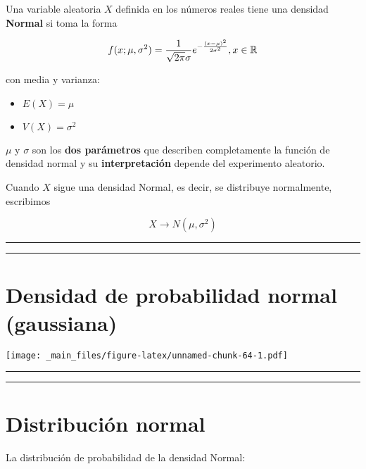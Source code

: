\documentclass[
]{book}
\providecommand{\tightlist}{%
  \setlength{\itemsep}{0pt}\setlength{\parskip}{0pt}}
\begin{document}
Una variable aleatoria \(X\) definida en los números reales tiene una densidad \textbf{Normal} si toma la forma

\[f(x; \mu, \sigma^2)=\frac{1}{\sqrt{2\pi}\sigma}e^{-\frac{(x-\mu)^2}{2\sigma^2}}, x \in  {\Bbb R}\]

con media y varianza:

\begin{itemize}
\tightlist
\item
  \(E(X) = \mu\)
\item
  \(V (X) = \sigma^2\)
\end{itemize}

\(\mu\) y \(\sigma\) son los \textbf{dos parámetros} que describen completamente la función de densidad normal y su \textbf{interpretación} depende del experimento aleatorio.

Cuando \(X\) sigue una densidad Normal, es decir, se distribuye normalmente, escribimos

\[X\rightarrow N(\mu,\sigma^2)\]

\begin{center}\rule{0.5\linewidth}{0.5pt}\end{center}

\begin{center}\rule{0.5\linewidth}{0.5pt}\end{center}

\hypertarget{densidad-de-probabilidad-normal-gaussiana}{%
\section{Densidad de probabilidad normal (gaussiana)}\label{densidad-de-probabilidad-normal-gaussiana}}

\texttt{[image: \_main\_files/figure-latex/unnamed-chunk-64-1.pdf]}

\begin{center}\rule{0.5\linewidth}{0.5pt}\end{center}

\begin{center}\rule{0.5\linewidth}{0.5pt}\end{center}

\hypertarget{distribuciuxf3n-normal-1}{%
\section{Distribución normal}\label{distribuciuxf3n-normal-1}}

La distribución de probabilidad de la densidad Normal:
\end{document}
